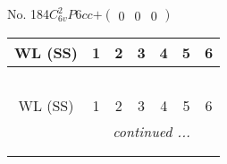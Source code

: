 \documentclass[fleqn,9pt,landscape]{jsarticle}
\begin{document}
\newpage
No. 184\quad$C_{6v}^{2}$\quad$P6cc$\quad[ hexagonal ]\quad$+\begin{pmatrix} 0 & 0 & 0 \end{pmatrix}$
\begin{center}
\renewcommand{\arraystretch}{1.2}
\begin{longtable}{ccccccc}
 \hline \hline
WL (SS) & 1 & 2 & 3 & 4 & 5 & 6 \\ \hline \endfirsthead

\multicolumn{6}{l}{\tablename\ \thetable{}} \\
 \hline \hline
WL (SS) & 1 & 2 & 3 & 4 & 5 & 6 \\ \hline \endhead

 \hline \hline
\multicolumn{6}{r}{\footnotesize\it continued ...} \\ \endfoot

 \hline \hline
\multicolumn{6}{r}{} \\ \endlastfoot


\end{longtable}
\end{center}
\end{document}
